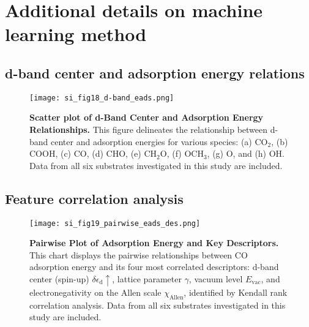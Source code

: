 

\section{Additional details on machine learning method}


\subsection{d-band center and adsorption energy relations}


\begin{figure}
  \centering
  \texttt{[image: si\_fig18\_d-band\_eads.png]}
  \caption{\textbf{Scatter plot of d-Band Center and Adsorption Energy Relationships.}
  This figure delineates the relationship between d-band center and adsorption energies for
  various species: (a) CO$_2$, (b) COOH, (c) CO, (d) CHO, (e) CH$_2$O, (f) OCH$_3$, (g) O, and (h) OH.
  Data from all six substrates investigated in this study are included.}
  \label{si_fig18:dband_vs_eads}
\end{figure}


\subsection{Feature correlation analysis}


\begin{figure}
  \centering
  \texttt{[image: si\_fig19\_pairwise\_eads\_des.png]}
  \caption{\textbf{Pairwise Plot of Adsorption Energy and Key Descriptors.}
  This chart displays the pairwise relationships between CO adsorption energy and
  its four most correlated descriptors: d-band center (spin-up) $\delta\epsilon_{\text{d}}\uparrow$,
  lattice parameter $\gamma$, vacuum level $E_\text{vac}$, and electronegativity
  on the Allen scale $\chi_\text{Allen}$, identified by Kendall rank correlation analysis.
  Data from all six substrates investigated in this study are included.}
  \label{si_fig19:pairwise_eads_des}
\end{figure}


